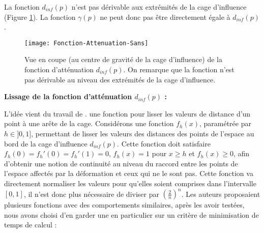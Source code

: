 \begin{center}
\end{center}

La fonction $d_{inf}(p)$ n'est pas dérivable aux extrémités de la cage d'influence
(Figure \ref{MELAtN}). La fonction $\gamma(p)$ ne peut donc pas être
directement égale à $d_{inf}(p)$.

\begin{figure}[ht]
\begin{center}
\texttt{[image: Fonction-Attenuation-Sans]}

\caption[Fonction d'atténuation $d_{inf}(p)$] {Vue en coupe (au centre de
gravité de la cage d'influence) de la fonction d'atténuation $d_{inf}(p)$. On
remarque que la fonction n'est pas dérivable au niveau des extrémités de la
cage d'influence.}

\label{MELAtN}

\end{center}
\end{figure}

\newpage

\textbf{Lissage de la fonction d'atténuation $d_{inf}(p)$ :}

L'idée vient du travail de \cite{GPCP13}. une fonction pour lisser les
valeurs de distance d'un point à une arête de la cage. Considérons une
fonction $f_h(x)$, paramétrée par $h \in ]0, 1]$, permettant de lisser les
valeurs des distances des points de l'espace au bord de la cage d'influence
$d_{inf}(p)$. Cette fonction doit satisfaire $f_h(0) = f_h'(0) = f_h'(1) = 0$,
$f_h(x)=1$ pour $x \geq h$ et $f_h(x) \geq 0$, afin d'obtenir une notion de
continuité au niveau du raccord entre les points de l'espace affectés par la
déformation et ceux qui ne le sont pas. Cette fonction va directement
normaliser les valeurs pour qu'elles soient comprises dans l'intervalle
$[0,1]$, il n'est donc plus nécessaire de diviser par $(\frac{2}{n})^n$. Les
auteurs proposaient plusieurs fonctions avec des comportements similaires,
après les avoir testées, nous avons choisi d'en garder une en particulier sur
un critère de minimisation de temps de calcul :

